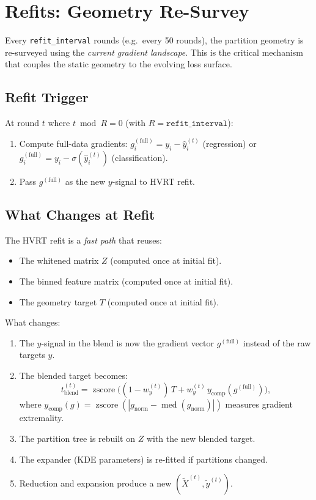 \documentclass[11pt,a4paper]{article}
\newcommand{\zscore}{\operatorname{zscore}}
\newcommand{\med}{\operatorname{med}}
\theoremstyle{definition}
\begin{document}
\section{Refits: Geometry Re-Survey}
\label{sec:refit}

Every \texttt{refit\_interval} rounds (e.g.\ every 50 rounds), the partition
geometry is re-surveyed using the \emph{current gradient landscape}.  This is
the critical mechanism that couples the static geometry to the evolving
loss surface.

\subsection{Refit Trigger}

At round $t$ where $t \bmod R = 0$ (with $R = \texttt{refit\_interval}$):

\begin{enumerate}[nosep]
    \item Compute full-data gradients:
        $g_i^{(\text{full})} = y_i - \hat{y}_i^{(t)}$ (regression) or
        $g_i^{(\text{full})} = y_i - \sigma(\hat{y}_i^{(t)})$ (classification).
    \item Pass $g^{(\text{full})}$ as the new $y$-signal to HVRT refit.
\end{enumerate}

\subsection{What Changes at Refit}

The HVRT refit is a \emph{fast path} that reuses:
\begin{itemize}[nosep]
    \item The whitened matrix $Z$ (computed once at initial fit).
    \item The binned feature matrix (computed once at initial fit).
    \item The geometry target $T$ (computed once at initial fit).
\end{itemize}

What changes:
\begin{enumerate}[nosep]
    \item The $y$-signal in the blend is now the gradient vector
        $g^{(\text{full})}$ instead of the raw targets $y$.
    \item The blended target becomes:
        \begin{equation}
            t_{\text{blend}}^{(t)} = \zscore\!\bigl(
                (1 - w_y^{(t)})\,T + w_y^{(t)}\,y_{\text{comp}}(g^{(\text{full})})
            \bigr),
        \end{equation}
        where $y_{\text{comp}}(g) = \zscore(|g_{\text{norm}} - \med(g_{\text{norm}})|)$
        measures gradient extremality.
    \item The partition tree is rebuilt on $Z$ with the new blended target.
    \item The expander (KDE parameters) is re-fitted if partitions changed.
    \item Reduction and expansion produce a new $(\tilde{X}^{(t)}, \tilde{y}^{(t)})$.
\end{enumerate}
\end{document}
